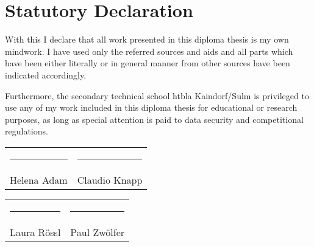 \chapter*{Statutory Declaration}
With this I declare that all work presented in this diploma thesis is my own mindwork. I have used only the referred sources and aids and all parts which have been either literally or in general manner from other sources have been indicated accordingly.

Furthermore, the secondary technical school \gls{htbla} Kaindorf/Sulm is privileged to use any of my work included in this diploma thesis for educational or research purposes, as long as special attention is paid to data security and competitional regulations.
\par\bigskip

\par\bigskip

\par\bigskip

\par\bigskip

\par\bigskip

\par\bigskip

\par\bigskip

\par\bigskip

\par\bigskip

\par\bigskip

\par\bigskip

\par\bigskip

\begin{tabular}{p{7cm}p{7cm}}
\rule{6cm}{0.4pt} & \rule{6cm}{0.4pt}\\
Helena Adam & Claudio Knapp
\end{tabular}

\par\bigskip

\par\bigskip

\par\bigskip

\par\bigskip

\begin{tabular}{p{7cm}p{7cm}}
\rule{6cm}{0.4pt} & \rule{6cm}{0.4pt}\\
Laura Rössl & Paul Zwölfer
\end{tabular}


